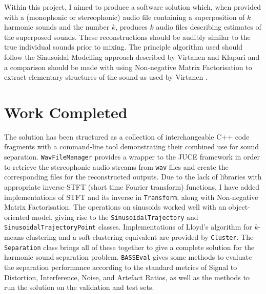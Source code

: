 \documentclass[12pt,a4paper,twoside,openright]{report}
\begin{document}
{\color{red}Within this project, I aimed to produce a software solution which, when provided with a (monophonic or stereophonic) audio file containing a superposition of $ k $ harmonic sounds and the number $ k $, produces $ k $ audio files describing estimates of the superposed sounds.} These reconstructions should be audibly similar to the true individual sounds prior to mixing. The principle algorithm used should follow the Sinusoidal Modelling approach described by Virtanen and Klapuri \cite{virtanen2000separation} and a comparison should be made with using Non-negative Matrix Factorisation to extract elementary structures of the sound as used by Virtanen \cite{virtanen2003sound}.

\section*{Work Completed}

{\color{red}The solution has been structured as a collection of interchangeable C++ code fragments with a command-line tool demonstrating their combined use for sound separation.} \texttt{WavFileManager} provides a wrapper to the JUCE \cite{juce} framework in order to retrieve the stereophonic audio streams from \texttt{wav} files and create the corresponding files for the reconstructed outputs. {\color{red}Due to the lack of libraries with appropriate inverse-STFT (short time Fourier transform) functions, I have added implementations of STFT and its inverse in \texttt{Transform}, along with Non-negative Matrix Factorisation.} The operations on sinusoids worked well with an object-oriented model, giving rise to the \texttt{SinusoidalTrajectory} and \texttt{SinusoidalTrajectoryPoint} classes. Implementations of Lloyd's algorithm for $ k $-means clustering and a soft-clustering equivalent are provided by \texttt{Cluster}. The \texttt{Separation} class brings all of these together to give a complete solution for the harmonic sound separation problem. \texttt{BASSEval} gives some methods to evaluate the separation performance according to the standard metrics of Signal to Distortion, Interference, Noise, and Artefact Ratios, as well as the methods to run the solution on the validation and test sets.


\end{document}
